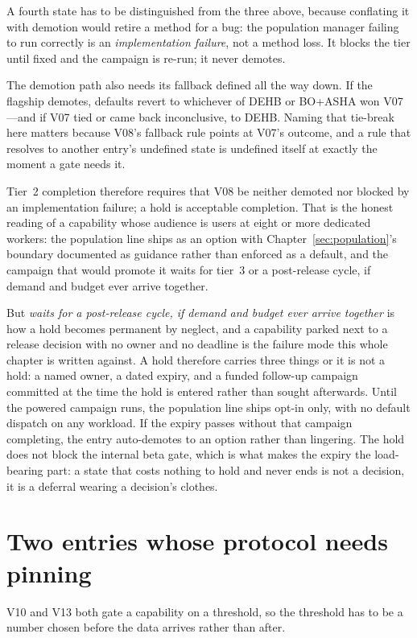 A fourth state has to be distinguished from the three above, because
conflating it with demotion would retire a method for a bug: the
population manager failing to run correctly is an
\emph{implementation failure}, not a method loss. It blocks the tier
until fixed and the campaign is re-run; it never demotes.

The demotion path also needs its fallback defined all the way down. If
the flagship demotes, defaults revert to whichever of DEHB or BO+ASHA
won V07—and if V07 tied or came back inconclusive, to DEHB. Naming that
tie-break here matters because V08's fallback rule points at V07's
outcome, and a rule that resolves to another entry's undefined state is
undefined itself at exactly the moment a gate needs it.

Tier~2 completion therefore requires that V08 be neither demoted nor
blocked by an implementation failure; a hold is acceptable
completion. That is the honest reading of a capability whose audience
is users at eight or more dedicated workers: the population line
ships as an option with Chapter~\ref{sec:population}'s boundary
documented as guidance rather than enforced as a default, and the
campaign that would promote it waits for tier~3 or a post-release
cycle, if demand and budget ever arrive together.

But \emph{waits for a post-release cycle, if demand and budget ever
arrive together} is how a hold becomes permanent by neglect, and a
capability parked next to a release decision with no owner and no
deadline is the failure mode this whole chapter is written against. A
hold therefore carries three things or it is not a hold: a named owner,
a dated expiry, and a funded follow-up campaign committed at the time
the hold is entered rather than sought afterwards. Until the powered
campaign runs, the population line ships opt-in only, with no default
dispatch on any workload. If the expiry passes without that campaign
completing, the entry auto-demotes to an option rather than lingering.
The hold does not block the internal beta gate, which is what makes the
expiry the load-bearing part: a state that costs nothing to hold and
never ends is not a decision, it is a deferral wearing a decision's
clothes.

\section{Two entries whose protocol needs pinning}

V10 and V13 both gate a capability on a threshold, so the threshold
has to be a number chosen before the data arrives rather than after.

